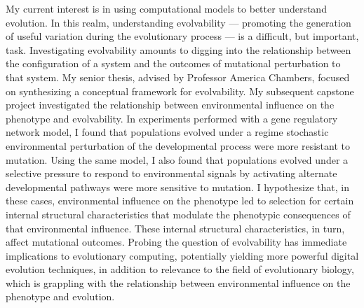 My current interest is in using computational models to better understand evolution.
In this realm, understanding evolvability  ---  promoting the generation of useful variation during the evolutionary process  ---  is a difficult, but important, task.
Investigating evolvability amounts to digging into the relationship between the configuration of a system and the outcomes of mutational perturbation to that system.
My senior thesis, advised by Professor America Chambers, focused on synthesizing a conceptual framework for evolvability.
My subsequent capstone project investigated the relationship between environmental influence on the phenotype and evolvability.
In experiments performed with a gene regulatory network model, I found that populations evolved under a regime stochastic environmental perturbation of the developmental process were more resistant to mutation.
Using the same model, I also found that populations evolved under a selective pressure to respond to environmental signals by activating alternate developmental pathways were more sensitive to mutation.
I hypothesize that, in these cases, environmental influence on the phenotype led to selection for certain internal structural characteristics that modulate the phenotypic consequences of that environmental influence.
These internal structural characteristics, in turn, affect mutational outcomes.
Probing the question of evolvability has immediate implications to evolutionary computing, potentially yielding more powerful digital evolution techniques, in addition to relevance to the field of evolutionary biology, which is grappling with the relationship between environmental influence on the phenotype and evolution.

